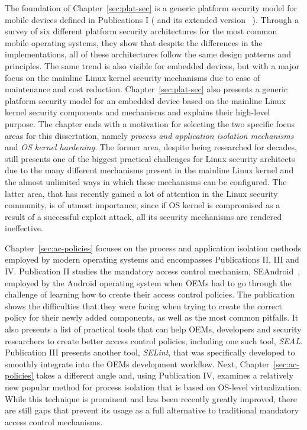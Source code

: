 The foundation of Chapter~\ref{sec:plat-sec} is a generic platform security model for mobile devices defined in Publications I ( and its extended version ~\cite{2013Asokan}). Through a survey of six different platform security architectures for the most common mobile operating systems, they show that despite the differences in the implementations, all of these architectures follow the same design patterns and principles. The same trend is also visible for embedded devices, but with a major focus on the mainline Linux kernel security mechanisms due to ease of maintenance and cost reduction. Chapter~\ref{sec:plat-sec} also presents a generic platform security model for an embedded device based on the mainline Linux kernel security components and mechanisms and explains their high-level purpose. The chapter ends with a motivation for selecting the two specific focus areas for this dissertation, namely \textit{process and application isolation mechanisms} and \textit{OS kernel hardening}. The former area, despite being researched for decades, still presents one of the biggest practical challenges for Linux security architects due to the many different mechanisms present in the mainline Linux kernel and the almost unlimited ways in which these mechanisms can be configured. The latter area, that has recently gained a lot of attention in the Linux security community, is of utmost importance, since if OS kernel is compromised as a result of a successful exploit attack, all its security mechanisms are rendered ineffective.

Chapter~\ref{sec:ac-policies} focuses on the process and application isolation methods employed by modern operating systems and encompasses Publications II, III and IV. Publication II studies the mandatory access control mechanism, SEAndroid~\cite{smalley12}, employed by the Android operating system when OEMs had to go through the challenge of learning how to create their access control policies. The publication shows the difficulties that they were facing when trying to create the correct policy for their newly added components, as well as the most common pitfalls. It also presents a list of practical tools that can help OEMs, developers and security researchers to create better access control policies, including one such tool, \textit{SEAL}. Publication III presents another tool, \textit{SELint}, that was specifically developed to smoothly integrate into the OEMs development workflow. Next, Chapter~\ref{sec:ac-policies} takes a different angle and, using Publication IV, examines a relatively new popular method for process isolation that is based on OS-level virtualization. While this technique is prominent and has been recently greatly improved, there are still gaps that prevent its usage as a full alternative to traditional mandatory access control mechanisms.

